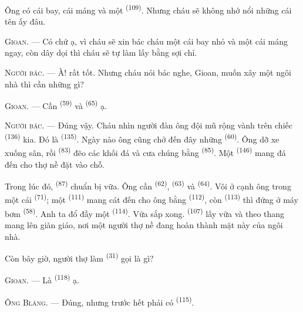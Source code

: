 Ông có cái bay, cái máng và một  \textsuperscript{(109)}. Nhưng cháu sẽ
không nhớ nổi những cái tên ấy đâu.

\textsc{Gioan}. --- Có chứ ạ, vì cháu sẽ xin bác cháu một cái bay nhỏ và một cái máng
ngay, còn dây dọi thì cháu sẽ tự làm lấy bằng sợi chỉ.

\VUsaut{3.0mm}
\VUsaut{3.0mm}

\textsc{Người bác}. --- À! rất tốt. Nhưng cháu nói bác nghe, Gioan, muốn xây một ngôi
nhà thì cần những gì?

\textsc{Gioan}. --- Cần  \textsuperscript{(59)} và 
\textsuperscript{(65)} ạ.

\textsc{Người bác}. --- Đúng vậy. Cháu nhìn người đàn ông đội mũ rộng vành trên chiếc
 \textsuperscript{(136)} kia. Đó là 
\textsuperscript{(135)}. Ngày nào ông cũng chở đến đây những 
\textsuperscript{(60)}. Ông dỡ xe xuống sân, rồi 
\textsuperscript{(83)} đẽo các khối đá và cưa chúng bằng 
\textsuperscript{(85)}. Một  \textsuperscript{(146)} mang đá đến
cho thợ nề đặt vào chỗ.

Trong lúc đó,  \textsuperscript{(87)} chuẩn bị vữa. Ông cần
 \textsuperscript{(62)},  \textsuperscript{(63)} và
 \textsuperscript{(64)}. Vôi ở cạnh ông trong một cái 
\textsuperscript{(71)}; một  \textsuperscript{(111)} mang cát đến cho
ông bằng  \textsuperscript{(112)}, còn 
\textsuperscript{(113)} thì đứng ở máy bơm \textsuperscript{(58)}. Anh ta đổ đầy một
 \textsuperscript{(114)}. Vữa sắp xong. 
\textsuperscript{(107)} lấy vữa và theo thang mang lên giàn giáo, nơi một người thợ nề
đang hoàn thành mặt này của ngôi nhà.

Còn bây giờ, người thợ làm  \textsuperscript{(31)} gọi là gì?

\textsc{Gioan}. --- Là  \textsuperscript{(118)} ạ.

\VUsaut{3.0mm}
\VUsaut{3.0mm}

\textsc{Ông Blăng}. --- Đúng, nhưng trước hết phải có 
\textsuperscript{(115)}.

